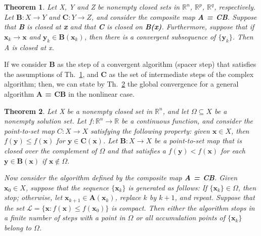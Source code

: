 \documentclass[11pt]{article}
\newtheorem{theorem}{Theorem}[section]
\begin{document}
\begin{theorem}
\label{th:zang_1}
Let X, Y and Z be nonempty closed sets in $\mathbb{R}^n$, $\mathbb{R}^p$, $\mathbb{R}^q$, respectively. Let $\mathbf{B}: X \rightarrow Y$ and $\mathbf{C}: Y \rightarrow Z$, and consider the composite map \textbf{A = CB}. Suppose that \textbf{B} is closed at \textbf{x} and that \textbf{C} is closed on \textbf{B(x)}. Furthermore, suppose that if $\mathbf{x}_k \rightarrow \mathbf{x}$ and $\mathbf{y}_k \in \mathbf{B}(\mathbf{x}_k)$, then there is a  convergent subsequence of $\{\mathbf{y}_k\}$. Then A is closed at x.
\end{theorem}

If we consider  \textbf{B} as the step of a convergent algorithm (spacer step) that satisfies the assumptions of Th.~\ref{th:zang_1}, and \textbf{C} as the set of intermediate steps of the complex algorithm; then, we can state by Th.~\ref{th:zang_2} the global convergence for a general algorithm \textbf{A = CB} in the nonlinear case.

\begin{theorem}
\label{th:zang_2}
Let X be a nonempty closed set in $\mathbb{R}^n$, and let $\Omega \subseteq	X$ be a nonempty solution set. Let $f: \mathbb{R}^n \rightarrow \mathbb{R}$ be a continuous function, and consider the point-to-set map $C: X \rightarrow X$ satisfying the following property: given $\mathbf{x} \in X$, then $f(\mathbf{y}) \leq f(\mathbf{x})$ for $\mathbf{y} \in \mathbf{C}(\mathbf{x})$. Let $\mathbf{B}: X \rightarrow X$ be a point-to-set map that is closed over the complement of $\Omega$ and that satisfies a $f(\mathbf{y}) < f(\mathbf{x})$ for each $\mathbf{y} \in \mathbf{B}(\mathbf{x})$ if $\mathbf{x} \notin \Omega$.

Now consider the algorithm defined by the composite map \textbf{A = CB}. Given $\mathbf{x}_0 \in X$, suppose that
the sequence $\{ \mathbf{x}_k \}$ is generated as follows: If $\{ \mathbf{x}_k \} \in \Omega$, then stop; otherwise, let
$\mathbf{x}_{k+1} \in \mathbf{A}(\mathbf{x}_k)$, replace $k$ by $k + 1$, and repeat. Suppose that the set $\mathcal{L} = \{ \mathbf{x} :f(\mathbf{x}) \le f(\mathbf{x}_0)\}$ is compact. Then either the algorithm stops in a finite
number of steps with a point in $\Omega$ or all accumulation points of $\{ \mathbf{x}_k\}$ belong to $\Omega$.
\end{theorem}
\end{document}

